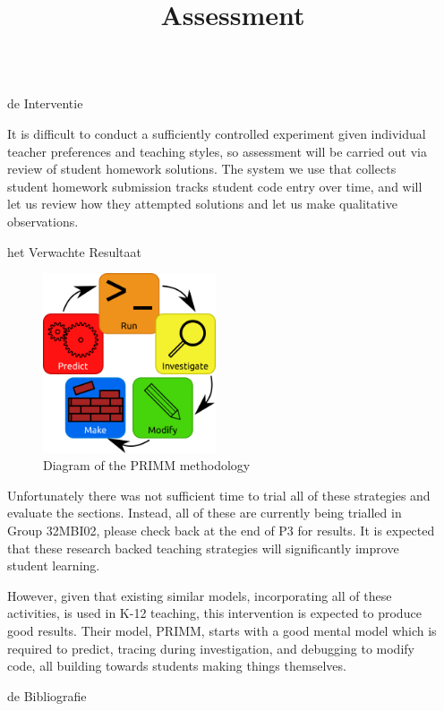 \documentclass[final]{beamer}
\newlength{\sepwidth}
\newlength{\colwidth}
\newcommand{\separatorcolumn}{\begin{column}{\sepwidth}\end{column}}
\begin{document}
\begin{frame}[t,fragile]
\begin{columns}[t]
\begin{column}{\colwidth}
\begin{exampleblock}{de Interventie}
    \title{Assessment}

      It is difficult to conduct a sufficiently controlled experiment given individual teacher preferences and teaching styles, so assessment will be carried out via review of student homework solutions. The system we use that collects student homework submission tracks student code entry over time, and will let us review how they attempted solutions and let us make qualitative observations.


  \end{exampleblock}

  \begin{block}{het Verwachte Resultaat}
    \begin{figure}
\centering
      \includegraphics[width=0.48\textwidth]{./primm.png}
          \caption{Diagram of the PRIMM methodology\cite{Sentance_2017}\label{fig:primm}}
\end{figure}
    Unfortunately there was not sufficient time to trial all of these strategies and evaluate the sections. Instead, all of these are currently being trialled in Group 32MBI02, please check back at the end of P3 for results. It is expected that these research backed teaching strategies will significantly improve student learning.

      However, given that existing similar models, incorporating all of these
      activities, is used in K-12 teaching\cite{Sentance_2017}, this
      intervention is expected to produce good results. Their model, PRIMM, starts with a good mental model which is required to predict, tracing during investigation, and debugging to modify code, all building towards students making things themselves.


  \end{block}

  \begin{block}{de Bibliografie}
    \nocite{*}
    \footnotesize{}

  \end{block}

\end{column}

\separatorcolumn
\end{columns}
\end{frame}
\end{document}
